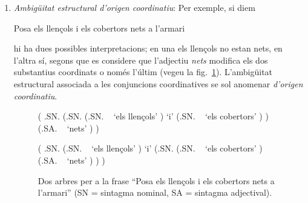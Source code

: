\begin{enumerate}
\item \emph{Ambigüitat estructural d'origen coordinatiu}: Per exemple,
  si diem
  \begin{exemple}
    Posa els llençols i els cobertors nets a l'armari
  \end{exemple} 
  hi ha dues possibles interpretacions; en una els llençols no estan
  nets, en l'altra sí, segons que es considere que l'adjectiu
  \emph{nets} modifica els dos substantius coordinats o només l'últim
  (vegeu la fig.~\ref{fg:cobertors}). L'ambigüitat estructural
  associada a les conjuncions coordinatives se sol anomenar
  \emph{d'origen coordinatiu}.

\begin{figure}
\begin{center}
\begin{parsetree}
    ( .SN.
      (.SN.
        (.SN. ~ `els llençols' )
        `i' 
        (.SN. ~ `els cobertors' )
      )
      (.SA. ~ `nets' )
    )
\end{parsetree}
\end{center}
\begin{center}
\begin{parsetree}
    ( .SN.
        (.SN. ~ `els llençols' )
        `i' 
        (.SN. 
        (.SN. ~ `els cobertors' )
        (.SA. ~ `nets' )
        )
    )
\end{parsetree}
\end{center}
\caption{Dos arbres per a la frase ``Posa els llençols i els cobertors
  nets a l'armari'' (SN = sintagma nominal, SA = sintagma
  adjectival).}
\label{fg:cobertors}
\end{figure}
 

\end{enumerate}
